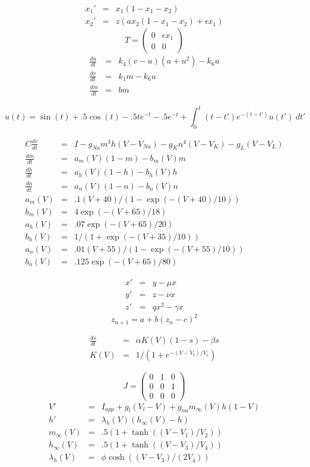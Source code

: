 \begin{eqnarray*}
x_1' &=& x_1(1-x_1-x_2) \\
x_2' &=& z(ax_2(1-x_1-x_2)+\epsilon x_1)
\end{eqnarray*}
\[
 T = \left(\begin{array}{cc}
      0 & \epsilon x_1 \\
      0 & 0
\end{array}
\right)
\]
\begin{eqnarray*}
\frac{du}{dt} &=& k_4(v-u)(a+u^2)-k_6u \\
\frac{dv}{dt} &=& k_1m-k_6u \\
\frac{dm}{dt} &=& bm 
\end{eqnarray*}

\[
 u(t) = \sin(t) + .5\cos(t)-.5te^{-t} - .5e^{-t} + \int_0^t (t-t')e^{-(t-t')} u(t')\ dt'
\]

\begin{eqnarray*}
C\frac{dv}{dt} &= &I - g_{Na} m^3h (V-V_{Na})-g_Kn^4 (V-V_K) -g_L (V-V_L) \\
 \frac{dm}{dt}& = & a_m(V) (1-m)-b_m(V) m \\
 \frac{dh}{dt}& = &a_h(V) (1-h)-b_h(V) h \\
 \frac{dn}{dt}& = &a_n(V) (1-n)-b_n(V) n \\
 a_m(V) &=&  .1 (V+40)/(1-\exp(-(V+40)/10)) \\
 b_m(V) &=&  4 \exp(-(V+65)/18) \\
 a_h(V) &=&  .07 \exp(-(V+65)/20) \\
 b_h(V) &=&  1/(1+\exp(-(V+35)/10)) \\
 a_n(V) &=&  .01 (V+55)/(1-\exp(-(V+55)/10))\\
 b_n(V) &=&  .125 \exp(-(V+65)/80) 
 \end{eqnarray*}

 \begin{eqnarray*}
 x' &=& y-\mu x \\
 y' &=& z-\nu x \\
 z' &=& qx^2-\gamma x
 \end{eqnarray*}
 \[
 z_{n+1} = a+b(z_n-c)^2
 \]

 \begin{eqnarray*}
 \frac{ds}{dt} &=& \alpha K(V) (1-s) - \beta s \\
 K(V) & = & 1/(1+e^{-(V-V_t)/V_s})
 \end{eqnarray*}

 \[
 J = \left(\begin{array}{ccc}
      0 & 1 & 0 \\
      0 & 0 & 1 \\
      0 & 0 & 0 
	   \end{array}
      \right)
 \]
\begin{eqnarray*}
V'&=&I_{app}+g_l(V_l-V)+g_{na}m_\infty(V)h(1-V)\\
h' &=&  \lambda_h(V)(h_\infty(V)-h)\\
m_\infty(V) &=&  .5(1+\tanh((V-V_1)/V_2))\\
h_\infty(V) &=& .5(1+\tanh((V-V_3)/V_4))\\
\lambda_h(V) &=& \phi\cosh((V-V_3)/(2V_4))\\
\end{eqnarray*}

